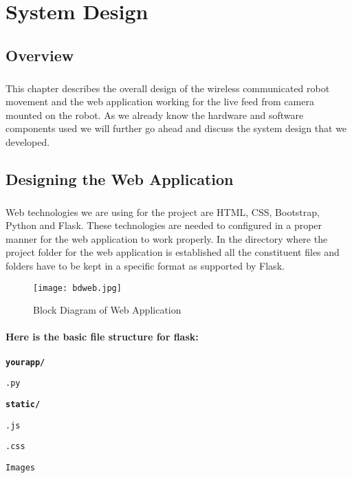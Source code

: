 \chapter{System Design}
\section{Overview}
\paragraph{} This chapter describes the overall design of the wireless communicated robot movement and the web application working for the live feed from camera mounted on the robot. As we already know the hardware and software components used we will further go ahead and discuss the system design that we developed.
\section{Designing the Web Application}
\paragraph{}Web technologies we are using for the project are HTML, CSS, Bootstrap, Python and Flask. These technologies are needed to configured in a proper manner for the web application to work properly. In the directory where the project folder for the web application is established all the constituent files and folders have to be kept in a specific format as supported by Flask.

\begin{figure}[h]
\centering
\texttt{[image: bdweb.jpg]}
\caption{Block Diagram of Web Application}
\end{figure}

\subsubsection*{Here is the basic file structure for flask:} 
\texttt{\textbf{\small{yourapp/}}}

\texttt{\small{.py}}

\textbf{\texttt{\small{static/}}}

\hspace{0.5in}\texttt{\small{.js}}

\hspace{0.5in}\texttt{\small{.css}}

\hspace{0.5in}\texttt{\small{Images}}


